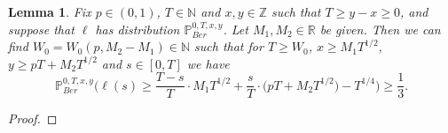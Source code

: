 \documentclass[12pt]{article}
\newtheorem{lemma}{Lemma}
\begin{document}
	\begin{lemma}\label{LemmaHalfS4} Fix $p \in (0,1)$, $T \in \mathbb{N}$ and $x, y\in \mathbb{Z}$ such that $T \geq y-x \geq 0$, and suppose that $\ell$ has distribution $\mathbb{P}^{0,T,x,y}_{Ber}$. Let $M_1, M_2 \in \mathbb{R}$ be given. Then we can find $W_0 = W_0(p,M_2 - M_1) \in \mathbb{N}$ such that for $T \geq W_0$, $x \geq M_1 T^{1/2}$, $y \geq pT + M_2 T^{1/2}$ and $s \in [0,T]$ we have
		\begin{equation}\label{halfEq1S4}
		\mathbb{P}^{0,T,x,y}_{Ber}\Big( \ell(s)  \geq \frac{T-s}{T} \cdot M_1 T^{1/2} + \frac{s}{T} \cdot \big(p T + M_2 T^{1/2}\big) - T^{1/4} \Big) \geq \frac{1}{3}.
		\end{equation}
	\end{lemma}

	\begin{proof}
		

\end{proof}
\end{document}
